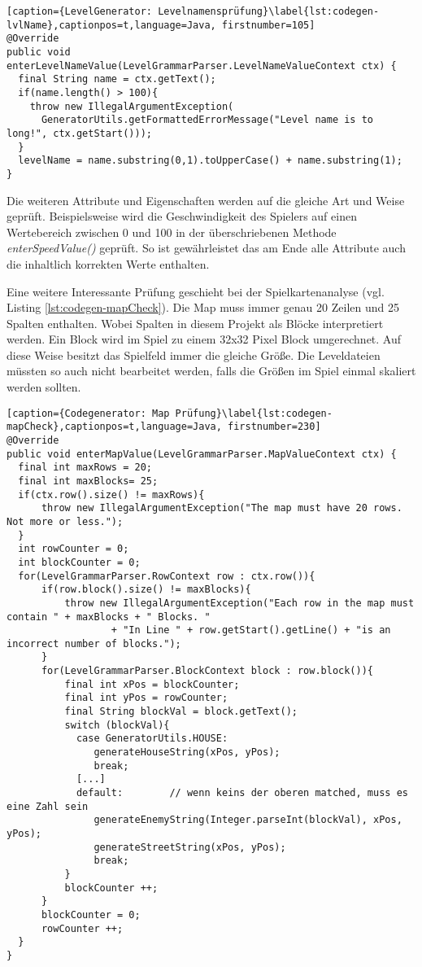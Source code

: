 \begin{lstlisting}[caption={LevelGenerator: Levelnamensprüfung}\label{lst:codegen-lvlName},captionpos=t,language=Java, firstnumber=105]
@Override
public void enterLevelNameValue(LevelGrammarParser.LevelNameValueContext ctx) {
  final String name = ctx.getText();
  if(name.length() > 100){
    throw new IllegalArgumentException(
      GeneratorUtils.getFormattedErrorMessage("Level name is to long!", ctx.getStart()));
  }
  levelName = name.substring(0,1).toUpperCase() + name.substring(1);
}
\end{lstlisting}

Die weiteren Attribute und Eigenschaften werden auf die gleiche Art und Weise geprüft. Beispielsweise wird die Geschwindigkeit des Spielers auf einen Wertebereich zwischen 0 und 100 in der überschriebenen Methode \textit{enterSpeedValue()} geprüft. So ist gewährleistet das am Ende alle Attribute auch die inhaltlich korrekten Werte enthalten. 

Eine weitere Interessante Prüfung geschieht bei der Spielkartenanalyse (vgl. Listing \ref{lst:codegen-mapCheck}). Die Map muss immer genau 20 Zeilen und 25 Spalten enthalten. Wobei Spalten in diesem Projekt als Blöcke interpretiert werden. Ein Block wird im Spiel zu einem 32x32 Pixel Block umgerechnet. Auf diese Weise besitzt das Spielfeld immer die gleiche Größe. Die Leveldateien müssten so auch nicht bearbeitet werden, falls die Größen im Spiel einmal skaliert werden sollten.

\begin{lstlisting}[caption={Codegenerator: Map Prüfung}\label{lst:codegen-mapCheck},captionpos=t,language=Java, firstnumber=230]
@Override
public void enterMapValue(LevelGrammarParser.MapValueContext ctx) {
  final int maxRows = 20;
  final int maxBlocks= 25;
  if(ctx.row().size() != maxRows){
      throw new IllegalArgumentException("The map must have 20 rows. Not more or less.");
  }
  int rowCounter = 0;
  int blockCounter = 0;
  for(LevelGrammarParser.RowContext row : ctx.row()){
      if(row.block().size() != maxBlocks){
          throw new IllegalArgumentException("Each row in the map must contain " + maxBlocks + " Blocks. "
                  + "In Line " + row.getStart().getLine() + "is an incorrect number of blocks.");
      }
      for(LevelGrammarParser.BlockContext block : row.block()){
          final int xPos = blockCounter;
          final int yPos = rowCounter;
          final String blockVal = block.getText();
          switch (blockVal){
            case GeneratorUtils.HOUSE:
               generateHouseString(xPos, yPos);
               break;
            [...]
            default:        // wenn keins der oberen matched, muss es eine Zahl sein
               generateEnemyString(Integer.parseInt(blockVal), xPos, yPos);
               generateStreetString(xPos, yPos);
               break;
          }
          blockCounter ++;
      }
      blockCounter = 0;
      rowCounter ++;
  }
}
\end{lstlisting}

